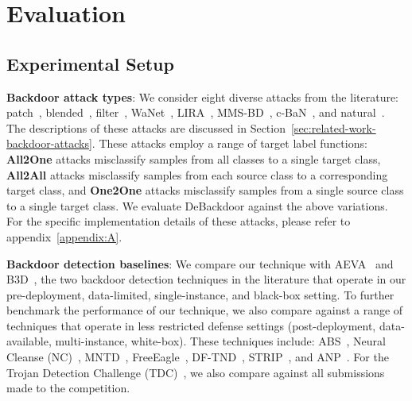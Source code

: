 \documentclass[letterpaper,twocolumn,10pt]{article}
\begin{document}
\section{Evaluation}
\label{sec:evaluation}




\subsection{Experimental Setup}


\textbf{Backdoor attack types}: We consider eight diverse attacks from the literature: patch~\cite{gu2017badnets}, blended~\cite{chen2017targeted}, filter~\cite{liu2019abs}, WaNet~\cite{nguyen2021wanet}, LIRA~\cite{doan2021lira}, MMS-BD~\cite{kwon2022multi}, c-BaN~\cite{salem2022dynamic}, and natural~\cite{fu2023eagle}. The descriptions of these attacks are discussed in Section~\ref{sec:related-work-backdoor-attacks}. These attacks employ a range of target label functions: \textbf{All2One} attacks misclassify samples from all classes to a single target class, \textbf{All2All} attacks misclassify samples from each source class to a corresponding target class, and \textbf{One2One} attacks misclassify samples from a single source class to a single target class. We evaluate DeBackdoor against the above variations. For the specific implementation details of these attacks, please refer to appendix~\ref{appendix:A}.




\textbf{Backdoor detection baselines}: We compare our technique with AEVA~\cite{guo2021aeva} and B3D~\cite{dong2021black}, the two backdoor detection techniques in the literature that operate in our pre-deployment, data-limited, single-instance, and black-box setting. To further benchmark the performance of our technique, we also compare against a range of techniques that operate in less restricted defense settings (post-deployment, data-available, multi-instance, white-box). These techniques include: ABS~\cite{liu2019abs}, Neural Cleanse (NC)~\cite{wang2019cleanse}, MNTD~\cite{xu2021mntd}, FreeEagle~\cite{fu2023eagle}, DF-TND~\cite{wang2020datafree}, STRIP~\cite{gao2019strip}, and ANP~\cite{wu2021adversarial}. For the Trojan Detection Challenge (TDC)~\cite{neurips2022tdc}, we also compare against all submissions made to the competition.
\end{document}
